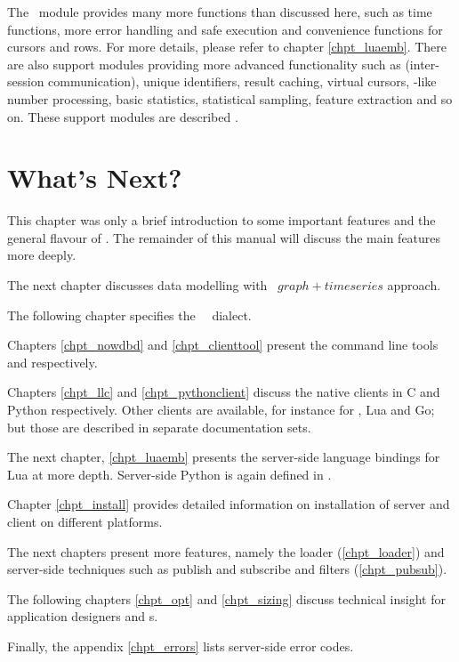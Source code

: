 The \nowdb\ module provides many more functions than discussed here,
such as time functions, more error handling and safe execution and
convenience functions for cursors and rows. For more details,
please refer to chapter \ref{chpt_luaemb}. There are also
support modules providing more advanced functionality such as
 (inter-session communication),
unique identifiers, result caching, virtual cursors,
-like number processing,
basic statistics, statistical sampling, feature extraction
and so on. These support modules are described
.

\section{What's Next?}
This chapter was only a brief introduction
to some important features and the general flavour 
of \nowdb. The remainder of this manual will
discuss the main features more deeply.

The next chapter discusses data modelling with
\nowdb\ $graph+timeseries$ approach.

The following chapter specifies the \nowdb\ \sql\ dialect.

Chapters \ref{chpt_nowdbd} and \ref{chpt_clienttool}
present the command line tools 
and  respectively.

Chapters \ref{chpt_llc} and \ref{chpt_pythonclient}
discuss the native clients in C and Python respectively.
Other clients are available, for instance for
\CC, Lua and Go; but those are described in separate
documentation sets.

The next chapter, \ref{chpt_luaemb} presents the server-side
language bindings for Lua at more depth. Server-side Python
is again defined in .

Chapter \ref{chpt_install} provides detailed information
on installation of server and client on different
platforms.

The next chapters present more features,
namely the loader (\ref{chpt_loader}) and
server-side techniques such as publish and subscribe and
filters (\ref{chpt_pubsub}).

The following chapters 
\ref{chpt_opt} and \ref{chpt_sizing}
discuss technical insight
for application designers and s.

Finally, the appendix \ref{chpt_errors} lists server-side
error codes.

